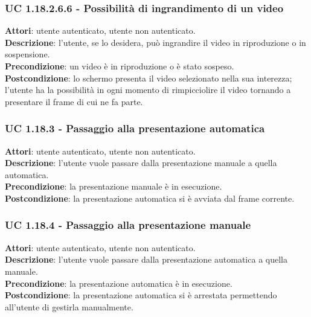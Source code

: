 	\subsubsection{UC 1.18.2.6.6 - Possibilità di ingrandimento di un video}{
		\label{uc1.18.2.6.6}
		\textbf{Attori}: utente autenticato, utente non autenticato. \\
		\textbf{Descrizione}: l'utente, se lo desidera, può ingrandire il video in riproduzione o in sospensione. \\
		\textbf{Precondizione}: un video è in riproduzione o è stato sospeso.	\\
		\textbf{Postcondizione}: lo schermo presenta il video selezionato nella sua interezza; l'utente ha la possibilità in ogni momento di rimpicciolire il video tornando a presentare il frame di cui ne fa parte.	\\
	}
	\subsubsection{UC 1.18.3 - Passaggio alla presentazione automatica}{
		\label{uc1.18.3}
		\textbf{Attori}: utente autenticato, utente non autenticato. \\
		\textbf{Descrizione}: l'utente vuole passare dalla presentazione manuale a quella automatica. \\
		\textbf{Precondizione}: la presentazione manuale è in esecuzione.	\\
		\textbf{Postcondizione}: la presentazione automatica si è avviata dal frame corrente.	\\
	}
	\subsubsection{UC 1.18.4 - Passaggio alla presentazione manuale}{
		\label{uc1.18.4}
		\textbf{Attori}: utente autenticato, utente non autenticato. \\
		\textbf{Descrizione}: l'utente vuole passare dalla presentazione automatica a quella manuale. \\
		\textbf{Precondizione}: la presentazione automatica è in esecuzione.	\\
		\textbf{Postcondizione}: la presentazione automatica si è arrestata permettendo all'utente di gestirla manualmente.	\\
	}